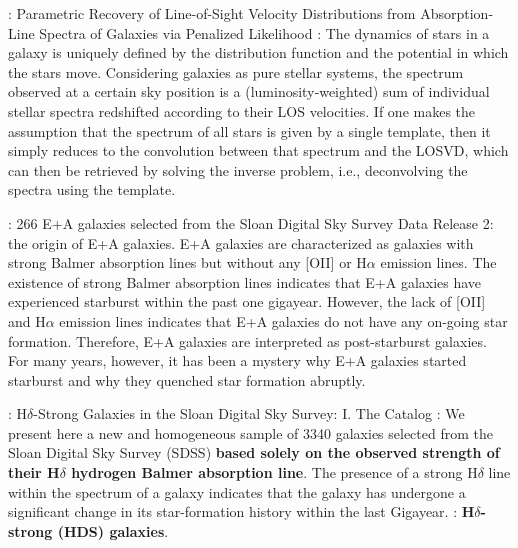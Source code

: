 \documentclass[ceqn,usenatbib,onecolumn]{mnras}
\begin{document}
\par \citet{2004PASP..116..138C} : {Parametric Recovery of Line-of-Sight Velocity Distributions from Absorption-Line Spectra of Galaxies via Penalized Likelihood} : The dynamics of stars in a galaxy is uniquely defined by the distribution function and the potential in which the stars move. Considering galaxies as pure stellar systems, the spectrum observed at a certain sky position is a (luminosity‐weighted) sum of individual stellar spectra redshifted according to their LOS velocities. If one makes the assumption that the spectrum of all stars is given by a single template, then it simply reduces to the convolution between that spectrum and the LOSVD, which can then be retrieved by solving the inverse problem, i.e., deconvolving the spectra using the template. 
\par \citet{2005MNRAS.357..937G} : {266 E+A galaxies selected from the Sloan Digital Sky Survey Data Release 2: the origin of E+A galaxies}. E+A galaxies are characterized as galaxies with strong Balmer absorption lines but without any [OII] or H$\alpha$ emission lines. The existence of strong Balmer absorption lines indicates that E+A galaxies have experienced starburst within the past one gigayear. However, the lack of [OII] and H$\alpha$ emission lines indicates that E+A galaxies do not have any on-going star formation. Therefore, E+A galaxies are interpreted as post-starburst galaxies. For many years, however, it has been a mystery why E+A galaxies started starburst and why they quenched star formation abruptly. 
\par \citet{10.1093/pasj/55.4.771} : {H$\delta$-Strong Galaxies in the Sloan Digital Sky Survey: I. The Catalog} : We present here a new and homogeneous sample of 3340 galaxies selected from the Sloan Digital Sky Survey (SDSS) \textbf{based solely on the observed strength of their H$\delta$ hydrogen Balmer absorption line}. The presence of a strong H$\delta$ line within the spectrum of a galaxy indicates that the galaxy has undergone a significant change in its star-formation history within the last Gigayear. : \textbf{H$\delta$-strong (HDS) galaxies}.
\end{document}
